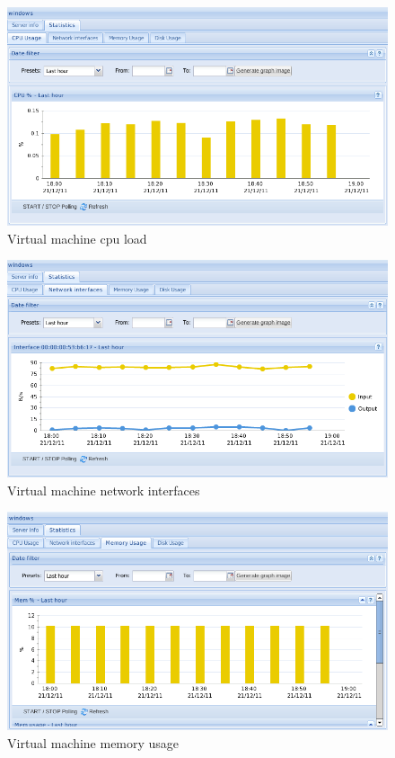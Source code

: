 \begin{figure}[H]
	\begin{center}
	\includegraphics[scale=0.45]{screenshots/vm_cpuload.png}
	\caption{Virtual machine cpu load}
	\label{fig:vm_cpuload}
	\end{center}
\end{figure}

\begin{figure}[H]
	\begin{center}
	\includegraphics[scale=0.45]{screenshots/vm_interfaces.png}
	\caption{Virtual machine network interfaces}
	\label{fig:vm_interfaces}
	\end{center}
\end{figure}

\begin{figure}[H]
	\begin{center}
	\includegraphics[scale=0.45]{screenshots/vm_mem.png}
	\caption{Virtual machine memory usage}
	\label{fig:vm_mem}
	\end{center}
\end{figure}

